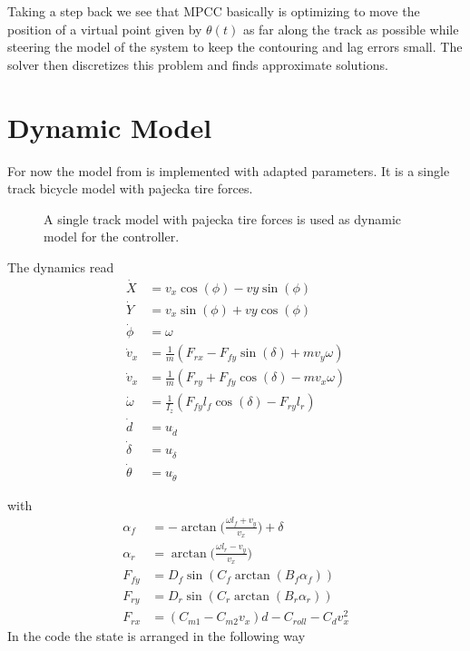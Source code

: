 \documentclass[12pt]{article}
\begin{document}
Taking a step back we see that MPCC basically is optimizing to move the position of a virtual point given by $\theta(t)$ as far along the track as possible while steering the model of the system to keep the contouring and lag errors small. The solver then discretizes this problem and finds approximate solutions.
\section{Dynamic Model}

For now the model from \cite{liniger2015optimization} is implemented with adapted parameters. It is a single track bicycle model with pajecka tire forces. 
\begin{figure}[h!]
	\vspace{-1 cm}
	\centering
	
	\caption{A single track model with pajecka tire forces is used as dynamic model for the controller.}
\end{figure}

The dynamics read 
\begin{align}
\dot{X} &= v_x\cos(\phi)-vy\sin(\phi)\\
\dot{Y} &= v_x\sin(\phi)+vy\cos(\phi)\\
\dot{\phi} &= \omega\\
\dot{v}_x &= \frac{1}{m}(F_{rx}-F_{fy}\sin(\delta)+mv_y\omega) \\
\dot{v}_x &= \frac{1}{m}(F_{ry}+F_{fy}\cos(\delta)-mv_x\omega) \\
\dot{\omega} &= \frac{1}{I_z}(F_{fy}l_f\cos(\delta)-F_{ry}l_r)\\
\dot{d} &= u_{\dot{d}}\\
\dot{\delta} &= u_{\dot{\delta}}\\
\dot{\theta} &= u_{\dot{ \theta}}
\end{align}

with
\begin{align}
\alpha_f &= -\arctan\Big(\frac{\omega l_f+v_y}{v_x}\Big)+\delta\\
\alpha_r &= \arctan\Big(\frac{\omega l_r-v_y}{v_x}\Big)\\
F_{fy} &= D_f\sin(C_f\arctan(B_f\alpha_f))\\	
F_{ry} &= D_r\sin(C_r\arctan(B_r\alpha_r))\\
F_{rx} &= (C_{m1}- C_{m2}v_x)d-C_{roll}-C_dv_x^2
\end{align}
In the code the state is arranged in the following way
\end{document}

